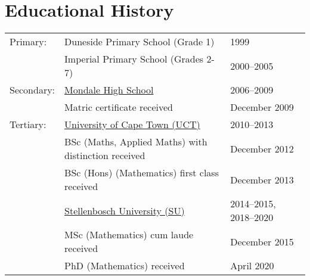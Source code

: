 \documentclass{article}
\begin{document}
\section{Educational History}
\begin{center} \newcommand{\ind}{\hspace{0.4cm}} \begin{tabular}{lll}
	\toprule
	Primary:		& Duneside Primary School (Grade 1)                           & 1999 \\
							& Imperial Primary School (Grades 2-7)                        & 2000--2005 \\
	\midrule
	Secondary:	& \href{http://www.mondalehs.co.za/}{Mondale High School}     & 2006--2009 \\
							& \ind Matric certificate received                          	& \ind December 2009 \\
	\midrule
	Tertiary:		& \href{http://www.uct.ac.za/}{University of Cape Town (UCT)} & 2010--2013 \\
							& \ind BSc (Maths, Applied Maths) with distinction received 	& \ind December 2012 \\
							& \ind BSc (Hons) (Mathematics) first class received        	& \ind December 2013 \\
							& \href{http://www.sun.ac.za/}{Stellenbosch University (SU)}  & 2014--2015, 2018--2020 \\
							& \ind MSc (Mathematics) cum laude received                 	& \ind December 2015 \\
							& \ind PhD (Mathematics) received															& \ind April 2020 \\
	\bottomrule
\end{tabular} \end{center}


\clearpage
\end{document}
